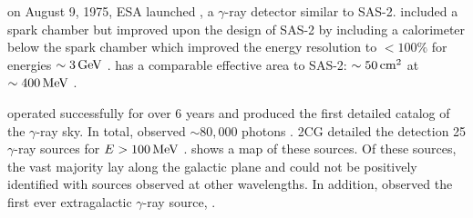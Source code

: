 

on August 9, 1975, \ac{ESA} launched \cosb, a $\gamma$-ray 
detector similar to \ac{SAS-2}. 
\cosb included a spark chamber but
improved upon the design of
\ac{SAS-2} by including a calorimeter below the spark chamber
which improved the energy resolution to $<100\%$ for energies $\sim
3\,\text{GeV}$ \citep{bignami_1975_cos-b-experiment}.
\cosb has a comparable effective area to \ac{SAS-2}:
$\sim 50\,\text{cm}^2$ at $\sim400\,\text{MeV}$
\citep{bignami_1975_cos-b-experiment}.  

\cosb operated successfully for over 6 years and produced the first
detailed catalog of the $\gamma$-ray sky.  In total, \cosb observed $\sim
80,000$ photons \cite{mayer-hasselwander_1982_large-scale-distribution}.
\Ac{2CG} detailed
the detection 25 $\gamma$-ray sources for $E>100\,\text{MeV}$
\citep{swanenburg_1981_second-catalog}.  
shows a map of these sources.  Of these sources, the vast majority
lay along the galactic plane and could not be positively identified
with sources observed at other wavelengths.  In addition, \cosb
observed the first ever extragalactic $\gamma$-ray source,
\citep[3C273,][]{swanenburg_1978_observation-high-energy}.

